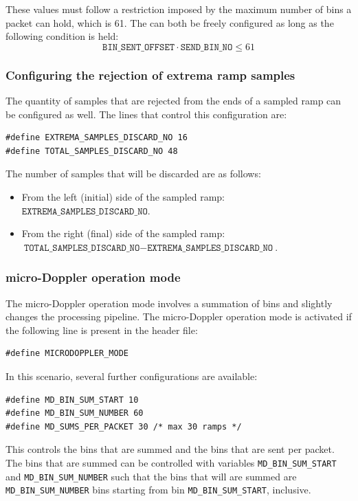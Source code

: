 These values must follow a restriction imposed by the maximum number of bins a packet can hold, which is 61. The can both be freely configured as long as the following condition is held:
\begin{equation}
	\mathtt{BIN\_SENT\_OFFSET} \cdot \mathtt{SEND\_BIN\_NO} \le 61
\end{equation}

\subsubsection{Configuring the rejection of extrema ramp samples}

The quantity of samples that are rejected from the ends of a sampled ramp can be configured as well. The lines that control this configuration are:
\begin{verbatim}
#define EXTREMA_SAMPLES_DISCARD_NO 16
#define TOTAL_SAMPLES_DISCARD_NO 48
\end{verbatim}
The number of samples that will be discarded are as follows:
\begin{itemize}
	\item From the left (initial) side of the sampled ramp: $\texttt{EXTREMA\_SAMPLES\_DISCARD\_NO}$.
	\item From the right (final) side of the sampled ramp: $\texttt{TOTAL\_SAMPLES\_DISCARD\_NO} - \texttt{EXTREMA\_SAMPLES\_DISCARD\_NO}$.
\end{itemize}

\subsubsection{micro-Doppler operation mode} \label{secdoc:micro_doppler_operation}

The micro-Doppler operation mode involves a summation of bins and slightly changes the processing pipeline. The micro-Doppler operation mode is activated if the following line is present in the header file:
\begin{verbatim}
#define MICRODOPPLER_MODE
\end{verbatim}

In this scenario, several further configurations are available:
\begin{verbatim}
#define MD_BIN_SUM_START 10
#define MD_BIN_SUM_NUMBER 60
#define MD_SUMS_PER_PACKET 30 /* max 30 ramps */
\end{verbatim}

This controls the bins that are summed and the bins that are sent per packet. The bins that are summed can be controlled with variables \texttt{MD\_BIN\_SUM\_START} and \texttt{MD\_BIN\_SUM\_NUMBER} such that the bins that will are summed are \texttt{MD\_BIN\_SUM\_NUMBER} bins starting from bin \texttt{MD\_BIN\_SUM\_START}, inclusive.

